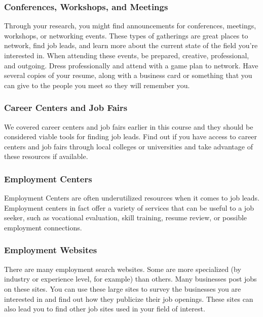 \subsubsection*{Conferences, Workshops, and Meetings}

Through your research, you might find announcements for conferences, meetings, workshops, or networking events. These types of gatherings are great places to network, find job leads, and learn more about the current state of the field you're interested in. When attending these events, be prepared, creative, professional, and outgoing. Dress professionally and attend with a game plan to network. Have several copies of your resume, along with a business card or something that you can give to the people you meet so they will remember you.

\subsubsection*{Career Centers and Job Fairs}

We covered career centers and job fairs earlier in this course and they should be considered viable tools for finding job leads. Find out if you have access to career centers and job fairs through local colleges or universities and take advantage of these resources if available.

\subsubsection*{Employment Centers}

Employment Centers are often underutilized resources when it comes to job leads. Employment centers in fact offer a variety of services that can be useful to a job seeker, such as vocational evaluation, skill training, resume review, or possible employment connections.

\subsubsection*{Employment Websites}

There are many employment search websites. Some are more specialized (by industry or experience level, for example) than others. Many businesses post jobs on these sites. You can use these large sites to survey the businesses you are interested in and find out how they publicize their job openings. These sites can also lead you to find other job sites used in your field of interest.

